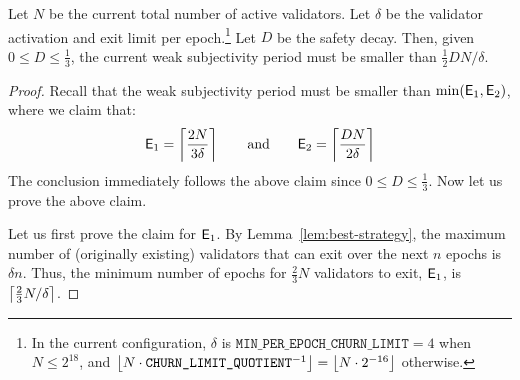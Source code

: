 \begin{theorem}\label{thm:weak-subjectivity-unit-balance}
Let $N$ be the current total number of active validators.
Let $\delta$ be the validator activation and exit limit per epoch.\footnote{In the current configuration, $\delta$ is $\texttt{MIN\_PER\_EPOCH\_CHURN\_LIMIT} = 4$ when $N \le 2^{18}$, and $\left\lfloor {N \cdot \texttt{CHURN\_LIMIT\_QUOTIENT}^{-1}} \right\rfloor = \left\lfloor {N \cdot 2^{-16}} \right\rfloor$ otherwise.}
Let $D$ be the safety decay.
Then, given $0 \le D \le \frac{1}{3}$, the current weak subjectivity period must be smaller than $\frac{1}{2} DN /\delta$.
\end{theorem}
\begin{proof}
Recall that the weak subjectivity period must be smaller than $\min(\mathsf{E}_1,\mathsf{E}_2)$, where we claim that:
\[
\mathsf{E}_1 = \left\lceil {\frac{2N}{3\delta}} \right\rceil
\qquad\mathrm{and}\qquad
\mathsf{E}_2 = \left\lceil {\frac{DN}{2\delta}} \right\rceil
\]
The conclusion immediately follows the above claim since $0 \le D \le \frac{1}{3}$.
Now let us prove the above claim.

Let us first prove the claim for $\mathsf{E}_1$.
By Lemma~\ref{lem:best-strategy}, the maximum number of (originally existing) validators that can exit over the next $n$ epochs is $\delta n$.
Thus, the minimum number of epochs for $\frac{2}{3} N$ validators to exit, $\mathsf{E}_1$, is $\left\lceil {\frac{2}{3}N/\delta} \right\rceil$.


\end{proof}
